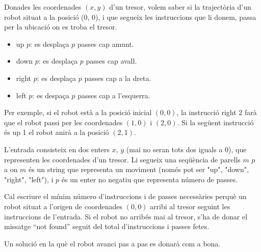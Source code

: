 

\Statement

Donades les coordenades $(x, y)$ d'un tresor, 
volem saber si la trajectòria d'un robot situat a la posició (0, 0), i que segueix les instruccions que li donem, passa per la ubicació on es troba el tresor.

\begin{itemize}
\item up $p$: es desplaça $p$ passes cap amunt.
\item down $p$: es desplaça $p$ passes cap avall.
\item right $p$: es desplaça $p$ passes cap a la dreta.
\item left $p$: es despaça $p$ passes cap a l'esquerra.
\end{itemize}

Per exemple, si el robot està a la posició inicial $(0, 0)$, la instrucció right $2$ farà que el robot passi per les coordenades $(1, 0)$ i $(2, 0)$. Si la següent instrucció és up 1 el robot anirà a la posició $(2, 1)$.

\Input

L'entrada consisteix en dos enters $x$, $y$ (mai no seran tots dos iguals a $0$), que representen les coordenades d'un tresor. Li segueix una seqüència de parells $m$ $p$ a on $m$ és un string que representa un moviment (només pot ser "up", "down", "right", "left"), i $p$ és un enter no negatiu que representa número de passes. 


\Output

Cal escriure el mínim número d'instruccions i de passes necessàries perquè un robot situat a l'origen de coordenades $(0, 0)$ arribi al tresor seguint les instruccions de l'entrada. Si el robot no arribés mai al tresor, s'ha de donar el missatge ``not found'' seguit del total d'instruccions i passes fetes.


\Sample


\Observation

Un solució en la què el robot avanci pas a pas es donarà com a bona.

